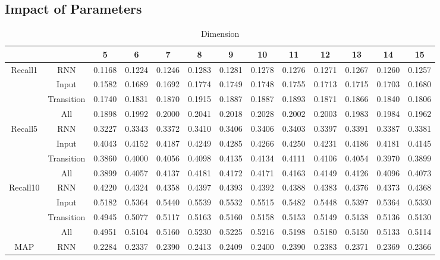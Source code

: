 \documentclass[conference]{IEEEtran}
\begin{document}
\subsection{Impact of Parameters}
\begin{table}[htbp]
\centering\scriptsize
\caption{Dimension}
\begin{tabular}{ccccccccccccc}
    \toprule
        &      &5   &6   &7  & 8  & 9  & 10&  11&  12 & 13&  14  &15  \\
    \midrule
    \multirow{4}[0]{*}{Recall1}
        & RNN& 0.1168  &0.1224 & 0.1246&  0.1283 & 0.1281 & 0.1278 & 0.1276&  0.1271 & 0.1267 & 0.1260 & 0.1257   \\
        &Input   &0.1582 & 0.1689 & 0.1692  &0.1774  &0.1749  &0.1748 & 0.1755 &0.1713  &0.1715  &0.1703  &0.1680   \\
        &Transition & 0.1740 & 0.1831&  0.1870  &0.1915 & 0.1887  &0.1887  &0.1893  &0.1871&  0.1866  &0.1840  &0.1806   \\
        &All &0.1898  &0.1992  &0.2000  &0.2041  &0.2018 & 0.2028  &0.2002  &0.2003  &0.1983 & 0.1984  &0.1962   \\
    \midrule
    \multirow{4}[0]{*}{Recall5}
        &RNN& 0.3227  &0.3343 & 0.3372 &0.3410  &0.3406&  0.3406&  0.3403 & 0.3397  &0.3391  &0.3387&  0.3381   \\
        & Input  & 0.4043 & 0.4152&  0.4187  &0.4249&  0.4285  &0.4266  &0.4250  &0.4231  &0.4186 & 0.4181  &0.4145   \\
        & Transition & 0.3860 &0.4000  &0.4056 & 0.4098  &0.4135  &0.4134  &0.4111&  0.4106  &0.4054  &0.3970 & 0.3899   \\
        &All &0.3899 & 0.4057  &0.4137  &0.4181  &0.4172  &0.4171  &0.4163  &0.4149  &0.4126  &0.4096 & 0.4073   \\
    \midrule
    \multirow{4}[0]{*}{Recall10}
        &RNN &0.4220&  0.4324  &0.4358 & 0.4397  &0.4393  &0.4392  &0.4388  &0.4383  &0.4376  &0.4373  &0.4368   \\
        &Input   &0.5182  &0.5364 & 0.5440  &0.5539  &0.5532  &0.5515 & 0.5482 & 0.5448  &0.5397  &0.5364  &0.5330   \\
        &Transition  &0.4945&  0.5077  &0.5117 & 0.5163  &0.5160  &0.5158  &0.5153  &0.5149 & 0.5138  &0.5136 & 0.5130   \\
        &All &0.4951 & 0.5104  &0.5160  &0.5230 & 0.5225&  0.5216  &0.5198  &0.5180&  0.5150 &0.5133  &0.5114   \\
    \midrule
    \multirow{4}[0]{*}{MAP}
        &RNN& 0.2284  &0.2337 & 0.2390 & 0.2413  &0.2409  &0.2400 & 0.2390&  0.2383&  0.2371  &0.2369  &0.2366   \\

\end{tabular}
\end{table}
\end{document}
